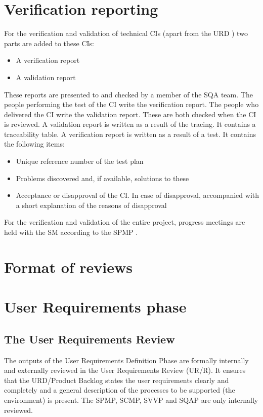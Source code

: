 \documentclass[%
		pathtobase=..,%
		titlefull={Software Validation and Verification Plan},%
		titleabbr=SVVP,%
		version=0.1]{fingerpaint}
\begin{document}
\chapter{Verification reporting}
    For the verification and validation of technical CIs (apart from the URD \cite{urd}) two parts are
    added to these CIs:
\begin{itemize}
\item A verification report
\item A validation report
\end{itemize}
    These reports are presented to and checked by a member of the SQA team. The people
    performing the test of the CI write the verification report. The people who delivered the CI
    write the validation report. These are both checked when the CI is reviewed. A validation
    report is written as a result of the tracing. It contains a traceability table. A verification
    report is written as a result of a test. It contains the following items:
\begin{itemize}
\item Unique reference number of the test plan
\item Problems discovered and, if available, solutions to these
\item Acceptance or disapproval of the CI. In case of disapproval, accompanied with a short explanation of the reasons of disapproval
\end{itemize}
For the verification and validation of the entire \projectname project, progress meetings are held with the SM according to the SPMP \cite{spmp}.


\appendix
\chapter{Format of reviews}\label{format review}


\chapter{User Requirements phase} \label{UR phase}
\section{The User Requirements Review}
The outputs of the User Requirements Definition Phase are formally internally and externally reviewed in the User Requirements Review (UR/R). It ensures that the URD/Product Backlog states the user requirements clearly and completely and a general description of the processes to be supported (the environment) is present. The SPMP, SCMP, SVVP and SQAP are only internally reviewed.
\end{document}
